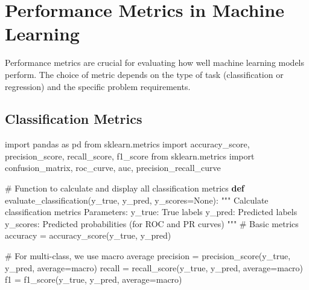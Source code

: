 \documentclass[
  letterpaper,
  DIV=11,
  numbers=noendperiod]{scrreprt}
\newenvironment{Shaded}{\begin{snugshade}}{\end{snugshade}}
\newcommand{\CommentTok}[1]{\textcolor[rgb]{0.37,0.37,0.37}{#1}}
\newcommand{\ImportTok}[1]{\textcolor[rgb]{0.00,0.46,0.62}{#1}}
\newcommand{\KeywordTok}[1]{\textcolor[rgb]{0.00,0.23,0.31}{\textbf{#1}}}
\newcommand{\NormalTok}[1]{\textcolor[rgb]{0.00,0.23,0.31}{#1}}
\newcommand{\OperatorTok}[1]{\textcolor[rgb]{0.37,0.37,0.37}{#1}}
\newcommand{\StringTok}[1]{\textcolor[rgb]{0.13,0.47,0.30}{#1}}
\newcommand{\VariableTok}[1]{\textcolor[rgb]{0.07,0.07,0.07}{#1}}
\begin{document}
\section{Performance Metrics in Machine
Learning}\label{performance-metrics-in-machine-learning}

Performance metrics are crucial for evaluating how well machine learning
models perform. The choice of metric depends on the type of task
(classification or regression) and the specific problem requirements.

\subsection{Classification Metrics}\label{classification-metrics}

\begin{Shaded}
\begin{Highlighting}[]
\ImportTok{import}\NormalTok{ pandas }\ImportTok{as}\NormalTok{ pd}
\ImportTok{from}\NormalTok{ sklearn.metrics }\ImportTok{import}\NormalTok{ accuracy\_score, precision\_score, recall\_score, f1\_score}
\ImportTok{from}\NormalTok{ sklearn.metrics }\ImportTok{import}\NormalTok{ confusion\_matrix, roc\_curve, auc, precision\_recall\_curve}

\CommentTok{\# Function to calculate and display all classification metrics}
\KeywordTok{def}\NormalTok{ evaluate\_classification(y\_true, y\_pred, y\_scores}\OperatorTok{=}\VariableTok{None}\NormalTok{):}
    \CommentTok{"""}
\CommentTok{    Calculate classification metrics}
\CommentTok{    }
\CommentTok{    Parameters:}
\CommentTok{    y\_true: True labels}
\CommentTok{    y\_pred: Predicted labels}
\CommentTok{    y\_scores: Predicted probabilities (for ROC and PR curves)}
\CommentTok{    """}
    \CommentTok{\# Basic metrics}
\NormalTok{    accuracy }\OperatorTok{=}\NormalTok{ accuracy\_score(y\_true, y\_pred)}
    
    \CommentTok{\# For multi{-}class, we use \textquotesingle{}macro\textquotesingle{} average}
\NormalTok{    precision }\OperatorTok{=}\NormalTok{ precision\_score(y\_true, y\_pred, average}\OperatorTok{=}\StringTok{\textquotesingle{}macro\textquotesingle{}}\NormalTok{)}
\NormalTok{    recall }\OperatorTok{=}\NormalTok{ recall\_score(y\_true, y\_pred, average}\OperatorTok{=}\StringTok{\textquotesingle{}macro\textquotesingle{}}\NormalTok{)}
\NormalTok{    f1 }\OperatorTok{=}\NormalTok{ f1\_score(y\_true, y\_pred, average}\OperatorTok{=}\StringTok{\textquotesingle{}macro\textquotesingle{}}\NormalTok{)}
    

\end{Highlighting}
\end{Shaded}
\end{document}
